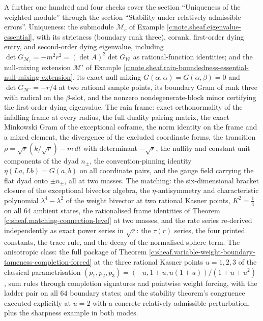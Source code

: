 \documentclass[11pt]{article}
\theoremstyle{definition}
\theoremstyle{plain}
\providecommand{\dtPG}{}\renewcommand{\dtPG}{dt}
\providecommand{\shW}{}\renewcommand{\shW}{\mathcal{W}}
\begin{document}
A further one hundred and four checks cover the section ``Uniqueness of the weighted module'' through the section ``Stability under relatively admissible errors''. Uniqueness: the submodule $\mathcal{M}_c$ of Example \ref{c:note.sheaf.eigenvalue-essential}, with its strictness (boundary rank three), corank, first-order dying entry, and second-order dying eigenvalue, including $\det G_{\mathcal{M}_c} = -m^2r^2 = (\det A)^2\det G_{\shW}$ as rational-function identities; and the null-mixing extension $\mathcal{M}'$ of Example \ref{c:note.sheaf.rain-boundedness-essential-null-mixing-extension}, its exact null mixing $G(\alpha,\alpha) = G(\alpha,\beta) = 0$ and $\det G_{\mathcal{M}'} = -r/4$ at two rational sample points, its boundary Gram of rank three with radical on the $\beta$-slot, and the nonzero nondegenerate-block minor certifying the first-order dying eigenvalue. The rain frame: exact orthonormality of the infalling frame at every radius, the full duality pairing matrix, the exact Minkowski Gram of the exceptional coframe, the norm identity on the frame and a mixed element, the divergence of the excluded coordinate forms, the transition $\rho = \sqrt r(k/\sqrt r) - m\,\dtPG$ with determinant $-\sqrt r$, the nullity and constant unit components of the dyad $n_\pm$, the convention-pinning identity $\eta(La,Lb) = G(a,b)$ on all coordinate pairs, and the gauge field carrying the flat dyad onto $\pm n_\pm$, all at two masses. The matching: the six-dimensional bracket closure of the exceptional bivector algebra, the $\eta$-antisymmetry and characteristic polynomial $\lambda^4 - \lambda^2$ of the weight bivector at two rational Kasner points, $K^2 = \tfrac14$ on all $64$ ambient states, the rationalised frame identities of Theorem \ref{c:sheaf.matching-connection-level} at two masses, and the rate series re-derived independently as exact power series in $\sqrt r$: the $\tau(r)$ series, the four printed constants, the trace rule, and the decay of the normalised sphere term. The anisotropic class: the full package of Theorem \ref{c:sheaf.variable-weight-boundary-tameness-completion-forced} at the three rational Kasner points $u = 1, 2, 3$ of the classical parametrisation $(p_1,p_2,p_3) = (-u, 1+u, u(1+u))/(1+u+u^2)$ \cite{Kasner1921}, sum rules through completion signatures and pointwise weight forcing, with the ladder pair on all $64$ boundary states; and the stability theorem's congruence executed explicitly at $u = 2$ with a concrete relatively admissible perturbation, plus the sharpness example in both modes.
\end{document}

